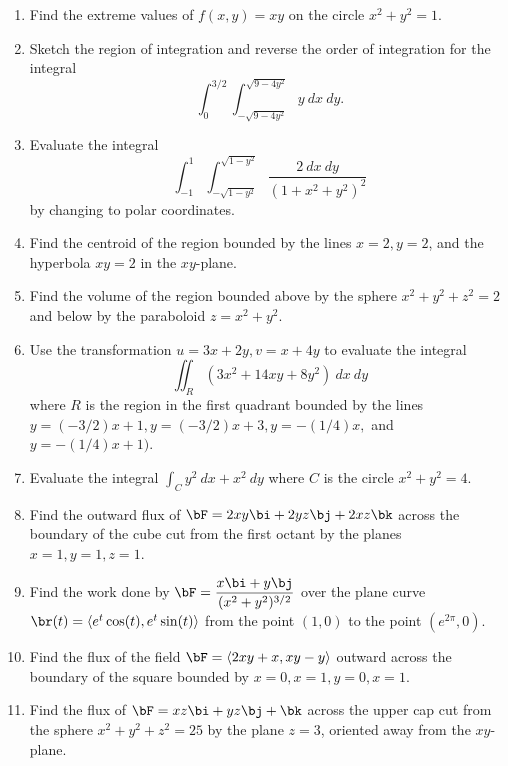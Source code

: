 {\begin{enumerate}
	\item Find the extreme values of $f(x,y)=xy$ on the circle $x^2+y^2=1$.

	\item Sketch the region of integration and reverse the order of integration for the integral
	\[\int_0^{3/2}\int_{-\sqrt{9-4y^2}}^{\sqrt{9-4y^2}}y\ dx\ dy.\]
	
	\item Evaluate the integral \[ \int_{-1}^1\int_{-\sqrt{1-y^2}}^{\sqrt{1-y^2}} \frac{2\ dx\ dy}{(1+x^2+y^2)^2} \] by changing to polar coordinates.
	
	\pagebreak

	\item Find the centroid of the region bounded by the lines $x=2,y=2$, and the hyperbola $xy=2$ in the $xy$-plane.

	\item Find the volume of the region bounded above by the sphere $x^2+y^2+z^2=2$ and below by the paraboloid $z=x^2+y^2$.

	\item Use the transformation $u=3x+2y, v=x+4y$ to evaluate the integral \[\iint_R (3x^2+14xy+8y^2)\ dx\ dy \] where $R$ is the region in the first quadrant bounded by the lines $y=(-3/2)x+1, y=(-3/2)x+3, y=-(1/4)x,$ and $y=-(1/4)x+1)$.
	
	\item Evaluate the integral $\int_C y^2\ dx + x^2\ dy$ where $C$ is the circle $x^2+y^2=4$.
	
	\item Find the outward flux of $\bF=2xy\bi+2yz\bj+2xz\bk$ across the boundary of the cube cut from the first octant by the planes $x=1, y=1, z=1$.

	\item Find the work done by $\bF = \dfrac{x\bi+y\bj}{(x^2+y^2)^{3/2}}$ over the plane curve $\br(t)=\langle e^t \cos(t), e^t\sin(t)\rangle$ from the point $(1,0)$ to the point $(e^{2\pi},0)$.

	\item Find the flux of the field $\bF=\langle 2xy+x, xy-y\rangle$ outward across the boundary of the square bounded by $x=0,x=1,y=0,x=1$.

	\item Find the flux of $\bF = xz\bi+yz\bj+\bk$ across the upper cap cut from the sphere $x^2+y^2+z^2=25$ by the plane $z=3$, oriented away from the $xy$-plane.
\end{enumerate}
}{}

